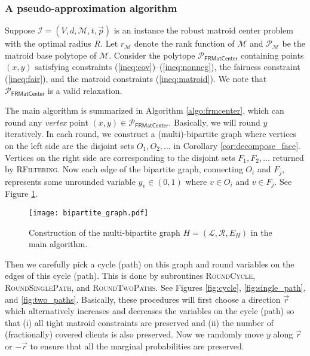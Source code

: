 \documentclass[a4paper,11pt]{article}
\newcommand{\I}{\mathcal{I}}
\newcommand{\R}{\mathcal{R}}
\newcommand{\M}{\mathcal{M}}
\renewcommand{\L}{\mathcal{L}}
\renewcommand{\P}{\mathcal{P}}
\begin{document}
\subsubsection{A pseudo-approximation algorithm}



Suppose $\I = (V, d, \M, t, \vec{p})$ is an instance the robust matroid center problem with the optimal radius $R$. Let $r_\M$ denote the rank function of $\M$ and $\P_\M$ be the matroid base polytope of $\M$. Consider the polytope $\P_\textsf{FRMatCenter}$  containing points $(x, y)$ satisfying constraints (\ref{ineq:cov})--(\ref{ineq:nonneg}), the fairness constraint (\ref{ineq:fair}), and the matroid constraints (\ref{ineq:matroid}).  We note that $\P_\textsf{FRMatCenter}$ is a valid relaxation.

The main algorithm is summarized in Algorithm \ref{algo:frmcenter}, which can round any \textit{vertex} point $(x, y) \in \P_\textsf{FRMatCenter}$. Basically, we will round $y$ iteratively. In each round, we construct a (multi)-bipartite graph where vertices on the left side are the disjoint sets $O_1, O_2, \ldots$ in Corollary \ref{cor:decompose_face}. Vertices on the right side are corresponding to the disjoint sets $F_1, F_2, \ldots$ returned by \textsc{RFiltering}. Now each edge of the bipartite graph, connecting $O_i$ and $F_j$, represents some unrounded variable $y_v \in (0,1)$ where $v \in O_i$ and $v \in F_j$. See Figure \ref{fig:bipartite_graph}.

\begin{figure}[h]
\centering
\texttt{[image: bipartite\_graph.pdf]}
\caption{Construction of the multi-bipartite graph $H=(\L,\R,E_H)$ in the main algorithm. }
\label{fig:bipartite_graph}
\end{figure}

Then we carefully pick a cycle (path) on this graph and round variables on the edges of this cycle (path). This is done by subroutines \textsc{RoundCycle}, \textsc{RoundSinglePath}, and \textsc{RoundTwoPaths}. See Figures \ref{fig:cycle}, \ref{fig:single_path}, and \ref{fig:two_paths}. Basically, these procedures will first choose a direction $\vec{r}$ which alternatively increases and decreases the variables on the cycle (path) so that (i) all tight matroid constraints are preserved and (ii) the number of (fractionally) covered clients is also preserved. Now we randomly move $y$ along $\vec{r}$ or $-\vec{r}$ to ensure that all the marginal probabilities are preserved.
\end{document}
